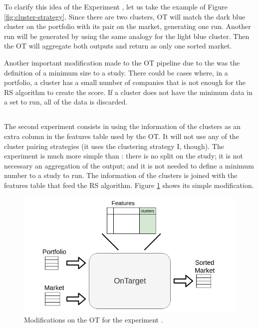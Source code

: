 To clarify this idea of the Experiment \nameExperimentI{}, let us take the example of Figure \ref{fig:cluster-strategy}. Since there are two clusters, OT will match the dark blue cluster on the portfolio with its pair on the market, generating one run. Another run will be generated by using the same analogy for the light blue cluster. Then the OT will aggregate both outputs and return as only one sorted market.

Another important modification made to the OT pipeline due to the \nameExperimentI{} was the definition of a minimum size to a study. There could be cases where, in a portfolio, a cluster has a small number of companies that is not enough for the RS algorithm to create the score. If a cluster does not have the minimum data in a set to run, all of the data is discarded.

\subsection{\fullNameExperimentII{}}

The second experiment consists in using the information of the clusters as an extra column in the features table used by the OT. It will not use any of the cluster pairing strategies (it uses the clustering strategy I, though). The experiment \nameExperimentII{} is much more simple than \nameExperimentI{}: there is no split on the study; it is not necessary an aggregation of the output; and it is not needed to define a minimum number to a study to run. The information of the clusters is joined with the features table that feed the RS algorithm. Figure \ref{fig:clusters-as-features} shows its simple modification.

\begin{figure}[H]
   \centering
   \includegraphics[width=\linewidth]{fig/ch3-clusters-as-features.png}
   \caption{Modifications on the OT for the experiment \nameExperimentII{}.}
   \label{fig:clusters-as-features}
\end{figure}
